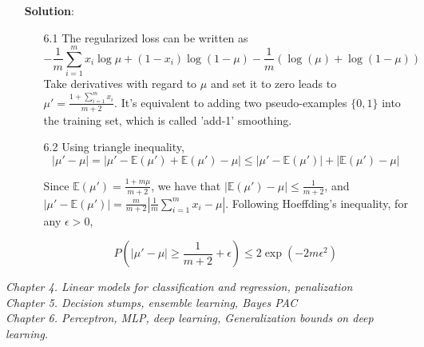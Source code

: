\documentclass{article}
\begin{document}
\begin{itemize}
\item[] \textbf{Solution}:
	\begin{itemize}
	\item[6.1] The regularized loss can be written as 
	\begin{equation*}
	-\frac{1}{m}\sum_{i=1}^m x_i\log \mu + (1-x_i)\log(1-\mu) - \frac{1}{m} (\log( \mu)+\log(1- \mu))
	\end{equation*}
Take derivatives with regard to $\mu$ and set it to zero leads to $\mu'=\frac{1+\sum_{i=1}^m x_i}{m+2}$. It's equivalent to adding two pseudo-examples $\{0,1\}$ into the training set, which is called 'add-1' smoothing.
	\item[6.2] Using triangle inequality,
	\begin{equation*}
	|\mu'-\mu| = |\mu'-\mathbb{E}(\mu')+\mathbb{E}(\mu')-\mu| \leq |\mu'-\mathbb{E}(\mu')| + |\mathbb{E}(\mu')-\mu|
	\end{equation*}

	Since $\mathbb{E}(\mu')=\frac{1+m\mu}{m+2}$, we have that $|\mathbb{E}(\mu')-\mu|\leq \frac{1}{m+2}$, and $|\mu'-\mathbb{E}(\mu')|=\frac{m}{m+2}|\frac{1}{m}\sum_{i=1}^m x_i -\mu|$. Following Hoeffding's inequality, for any $\epsilon>0$, 
	
	\begin{equation*}
	P\left(|\mu'-\mu|\geq \frac{1}{m+2} +\epsilon \right) \leq 2\exp\left( -2m\epsilon^2 \right)
	\end{equation*}
	
	\end{itemize}


\end{itemize}
\textit{
	Chapter 4. Linear models for classification and regression, penalization \\
	  Chapter 5. Decision stumps, ensemble learning, Bayes PAC \\
      Chapter 6. Perceptron, MLP, deep learning, Generalization bounds on deep learning.}
      
\end{document}
